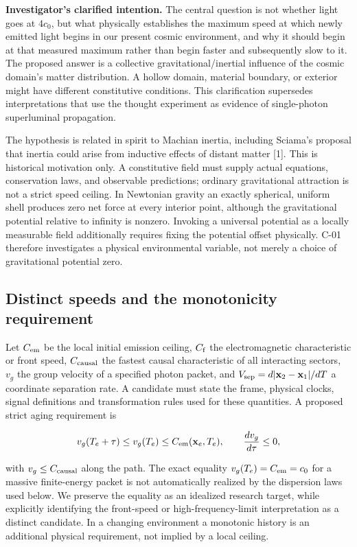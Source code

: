 \documentclass[
  11pt,
  twoside]{article}
\begin{document}
\textbf{Investigator's clarified intention.} The central question is not
whether light goes at \(4c_0\), but what physically establishes the
maximum speed at which newly emitted light begins in our present cosmic
environment, and why it should begin at that measured maximum rather
than begin faster and subsequently slow to it. The proposed answer is a
collective gravitational/inertial influence of the cosmic domain's
matter distribution. A hollow domain, material boundary, or exterior
might have different constitutive conditions. This clarification
supersedes interpretations that use the thought experiment as evidence
of single-photon superluminal propagation.

The hypothesis is related in spirit to Machian inertia, including
Sciama's proposal that inertia could arise from inductive effects of
distant matter {[}1{]}. This is historical motivation only. A
constitutive field must supply actual equations, conservation laws, and
observable predictions; ordinary gravitational attraction is not a
strict speed ceiling. In Newtonian gravity an exactly spherical, uniform
shell produces zero net force at every interior point, although the
gravitational potential relative to infinity is nonzero. Invoking a
universal potential as a locally measurable field additionally requires
fixing the potential offset physically. C-01 therefore investigates a
physical environmental variable, not merely a choice of gravitational
potential zero.

\subsection{Distinct speeds and the monotonicity
requirement}\label{distinct-speeds-and-the-monotonicity-requirement}

Let \(C_{\rm em}\) be the local initial emission ceiling, \(C_{\rm f}\)
the electromagnetic characteristic or front speed, \(C_{\rm causal}\)
the fastest causal characteristic of all interacting sectors, \(v_g\)
the group velocity of a specified photon packet, and
\(V_{\rm sep}=d|\mathbf{x}_2-\mathbf{x}_1|/dT\) a coordinate separation
rate. A candidate must state the frame, physical clocks, signal
definitions and transformation rules used for these quantities. A
proposed strict aging requirement is

\[v_g(T_e+\tau)\leq v_g(T_e)\leq C_{\rm em}(\mathbf{x}_e,T_e),\qquad \frac{dv_g}{d\tau}\leq 0,\]

with \(v_g\leq C_{\rm causal}\) along the path. The exact equality
\(v_g(T_e)=C_{\rm em}=c_0\) for a massive finite-energy packet is not
automatically realized by the dispersion laws used below. We preserve
the equality as an idealized research target, while explicitly
identifying the front-speed or high-frequency-limit interpretation as a
distinct candidate. In a changing environment a monotonic history is an
additional physical requirement, not implied by a local ceiling.
\end{document}
